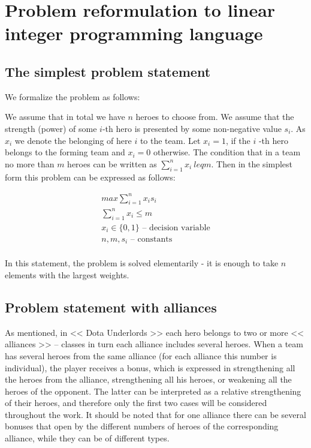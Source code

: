 \documentclass{article}
\begin{document}
\section{Problem reformulation to linear integer programming language }
\label{SectionDUIP}

\subsection{The simplest problem statement}

We formalize the problem as follows:

We assume that in total we have $n$ heroes to choose from. We assume that the strength (power) of some $i$-th hero is presented by some non-negative value $s_i$. As $x_i$ we denote the  belonging of here $i$ to the team. Let $ x_i = 1 $, if the $ i $ -th hero belongs to the forming team and $ x_i = 0 $ otherwise. The condition that in a team no more than $m$  heroes can be written as $ \sum_{i=1}^n x_i \ leq m $. Then in the simplest form this problem can be expressed as follows:

\begin{equation}
\begin{gathered}
    max \sum_{i=1}^n x_i s_i \\
    \sum_{i=1}^n x_i \leq m \\
    x_i \in \{0, 1\} \text{ – decision variable} \\
   n, m, s_i \text{ – constants}  \\
\end{gathered}
\end{equation}


In this statement, the problem is solved elementarily - it is enough to take $ n $ elements with the largest weights.

\subsection{Problem statement with alliances}
As mentioned, in << Dota Underlords >> each hero belongs to two or more << alliances >> -- classes in turn each alliance includes several heroes. When a team has several heroes from the same alliance (for each alliance this number is individual), the player receives a bonus, which is expressed in strengthening all the heroes from the alliance, strengthening all his heroes, or weakening all the heroes of the opponent. The latter can be interpreted as a relative strengthening of their heroes, and therefore only the first two cases will be considered throughout the work. It should be noted that for one alliance there can be several bonuses that open by the different numbers of heroes of the corresponding alliance, while they can be of different types.
\end{document}
